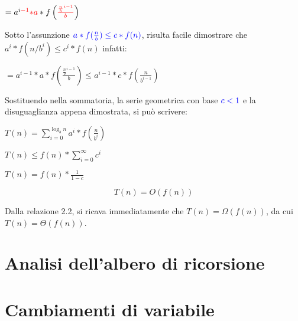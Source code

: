 $=a^{i\textcolor{red}{-1}} \textcolor{red}{* a} * f\left(\textcolor{red}{\frac{\frac{n}{b}^{i-1}}{b}}\right)$

Sotto l’assunzione $\textcolor{blue}{a*f(\frac{n}{b}) \leq c*f(n)}$, risulta facile dimostrare che $a^i * f(n/b^i) \leq c^i * f(n)$ infatti:

$=a^{i-1} * a * f\left(\frac{\frac{n}{b}^{i-1}}{b}\right) \leq a^{i-1} * c * f\left(\frac{n}{b^{i-1}}\right)$

Sostituendo nella sommatoria, la serie geometrica con base $\textcolor{blue}{c < 1}$ e la disuguaglianza appena dimostrata, si può scrivere:


$T(n) = \sum_{i=0}^{\log_b{n}}{a^i * f\left(\frac{n}{b^i}\right)}$

$T(n) \leq f(n) *  \sum_{i=0}^{\infty}{c^i}$

$T(n) = f(n) * \frac{1}{1-c}$

\begin{equation}
T(n) = O(f(n))
\end{equation}

Dalla relazione 2.2, si ricava immediatamente che $T(n) = \Omega(f(n))$, da cui $T(n) = \Theta(f(n))$.

\section{Analisi dell'albero di ricorsione}


\section{Cambiamenti di variabile}

